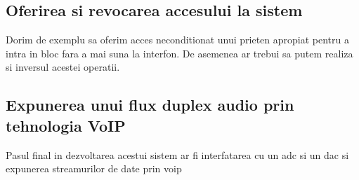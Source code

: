 \subsection{Oferirea si revocarea accesului la sistem}

Dorim de exemplu sa oferim acces neconditionat unui prieten apropiat pentru a intra in bloc fara a mai suna la interfon. De asemenea ar trebui sa putem realiza si inversul acestei operatii.

\subsection{Expunerea unui flux duplex audio prin tehnologia VoIP}

Pasul final in dezvoltarea acestui sistem ar fi interfatarea cu un \acrfull{adc} si un \acrfull{dac} si expunerea streamurilor de date prin \acrfull{voip}
